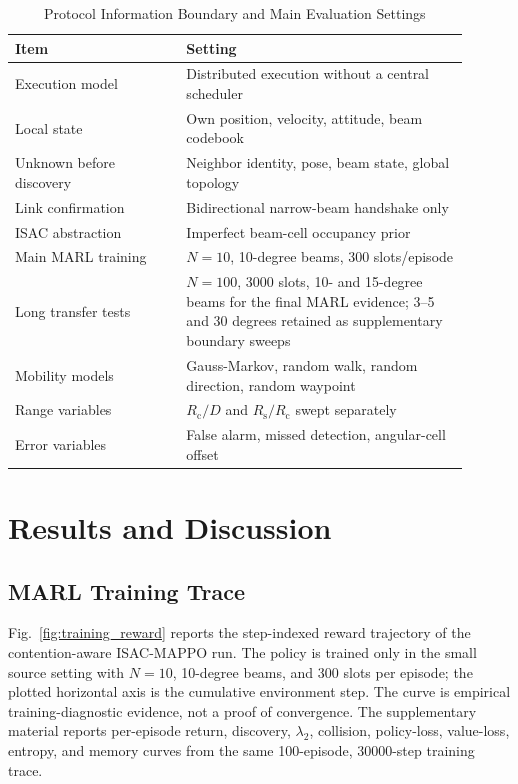 \documentclass[journal]{IEEEtran}
\newcommand{\Rc}{R_{\mathrm{c}}}
\newcommand{\Rs}{R_{\mathrm{s}}}
\begin{document}
\begin{table}[!t]
  \centering
  \caption{Protocol Information Boundary and Main Evaluation Settings}
  \label{tab:settings}
  \scriptsize
  \begin{tabular}{p{0.34\linewidth}p{0.56\linewidth}}
    \toprule
    Item & Setting \\
    \midrule
    Execution model & Distributed execution without a central scheduler \\
    Local state & Own position, velocity, attitude, beam codebook \\
    Unknown before discovery & Neighbor identity, pose, beam state, global topology \\
    Link confirmation & Bidirectional narrow-beam handshake only \\
    ISAC abstraction & Imperfect beam-cell occupancy prior \\
    Main MARL training & $N=10$, 10-degree beams, 300 slots/episode \\
    Long transfer tests & $N=100$, 3000 slots, 10- and 15-degree beams for the final MARL evidence; 3--5 and 30 degrees retained as supplementary boundary sweeps \\
    Mobility models & Gauss-Markov, random walk, random direction, random waypoint \\
    Range variables & $\Rc/D$ and $\Rs/\Rc$ swept separately \\
    Error variables & False alarm, missed detection, angular-cell offset \\
    \bottomrule
  \end{tabular}
\end{table}

\section{Results and Discussion}
\subsection{MARL Training Trace}
Fig.~\ref{fig:training_reward} reports the step-indexed reward trajectory of the contention-aware ISAC-MAPPO run.
The policy is trained only in the small source setting with $N=10$, 10-degree beams, and 300 slots per episode; the plotted horizontal axis is the cumulative environment step.
The curve is empirical training-diagnostic evidence, not a proof of convergence.
The supplementary material reports per-episode return, discovery, $\lambda_2$, collision, policy-loss, value-loss, entropy, and memory curves from the same 100-episode, 30000-step training trace.
\end{document}
